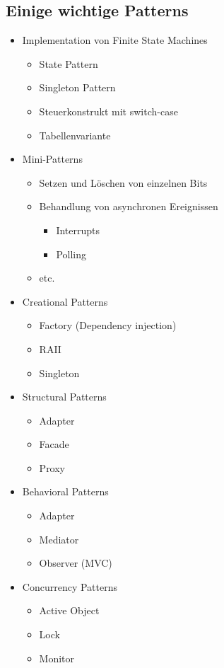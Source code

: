 \subsection{Einige wichtige Patterns}
\begin{minipage}[t]{10cm}
\begin{itemize}
\item Implementation von Finite State Machines
	\begin{itemize}
	\item State Pattern
	\item Singleton Pattern
	\item Steuerkonstrukt mit switch-case
	\item Tabellenvariante
	\end{itemize}
\item Mini-Patterns
	\begin{itemize}
	\item Setzen und Löschen von einzelnen Bits
	\item Behandlung von asynchronen Ereignissen
		\begin{itemize}
		\item Interrupts
		\item Polling
		\end{itemize}
	\item etc.
	\end{itemize}
\item Creational Patterns
	\begin{itemize}
	\item Factory (Dependency injection)
	\item RAII
	\item Singleton
	\end{itemize}
\end{itemize}
\end{minipage}
\begin{minipage}[t]{8cm}
\begin{itemize}
\item Structural Patterns
	\begin{itemize}
	\item Adapter
	\item Facade
	\item Proxy
	\end{itemize}
\item Behavioral Patterns
	\begin{itemize}
	\item Adapter
	\item Mediator
	\item Observer (MVC)
	\end{itemize}
\item Concurrency Patterns
	\begin{itemize}
	\item Active Object
	\item Lock
	\item Monitor
	\end{itemize}	
\end{itemize}
\end{minipage}

